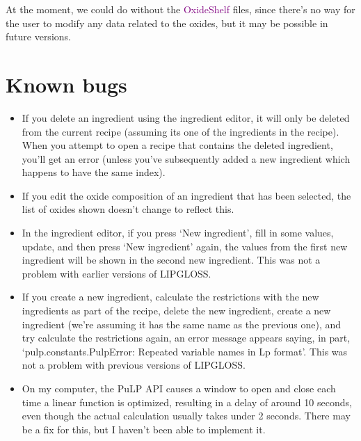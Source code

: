 \documentclass[a4paper,10pt]{article}
\def\'{\textquotesingle}
\def\green{\textcolor{Purple}}
\begin{document}
At the moment, we could do without the \green{OxideShelf} files, since there's no way for the user to modify any data related to the oxides, but it may be possible in future versions.

\section{Known bugs}
\begin{itemize}
\item If you delete an ingredient using the ingredient editor, it will only be deleted from the current recipe (assuming it\'s one of the ingredients in the recipe). When you attempt to open a recipe that contains the deleted ingredient, you'll get an error (unless you've subsequently added a new ingredient which happens to have the same index).
\item If you edit the oxide composition of an ingredient that has been selected, the list of oxides shown doesn't change to reflect this.
\item In the ingredient editor, if you press `New ingredient', fill in some values, update, and then press `New ingredient' again, the values from the first new ingredient will be shown in the second new ingredient. This was not a problem with earlier versions of LIPGLOSS.
\item If you create a new ingredient, calculate the restrictions with the new ingredients as part of the recipe, delete the new ingredient, create a new ingredient (we're assuming it has the same name as the previous one), and try calculate the restrictions again, an error message appears saying, in part, `pulp.constants.PulpError: Repeated variable names in Lp format'. This was not a problem with previous versions of LIPGLOSS.
\item On my computer, the PuLP API causes a window to open and close each time a linear function is optimized, resulting in a delay of around 10 seconds, even though the actual calculation usually takes under 2 seconds. There may be a fix for this, but I haven't been able to implement it.
\end{itemize}
\end{document}
